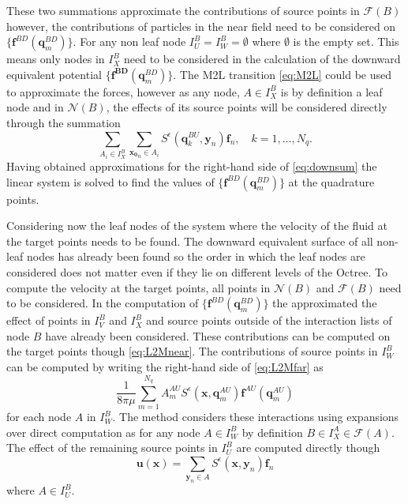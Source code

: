 These two summations approximate the contributions of source points in $\mathcal{F}(B)$ however, the contributions of particles in the near field need to be considered on $\{\bm{f}^{B D}(\bm{q}^{BD}_m)\}$. For any non leaf node $I_U^B = I_W^B = \emptyset$ where $\emptyset$ is the empty set. This means only nodes in $I_X^B$ need to be considered in the calculation of the downward equivalent potential $\{\bm{f^{BD}}(\bm{q}^{BD}_m)\}$. The M2L transition \cref{eq:M2L} could be used to approximate the forces, however as any node, $A \in I_X^B$ is by definition a leaf node and in $\mathcal{N}(B)$, the effects of its source points will be considered directly through the summation
\begin{equation}
\label{eq:X}
    \sum_{A_i \in I_X^B} \sum_{{\bm{x_0}}_n\in A_i} S^\epsilon\left(\bm{q}^{BU}_{k}, {\bm{y}}_{n}\right) {\bm{f}}_{n}, \quad k=1,\dots,N_q.
\end{equation}
Having obtained approximations for the right-hand side of \cref{eq:downsum} the linear system is solved to find the values of $\{\bm{f}^{BD}(\bm{q}^{BD}_m)\}$ at the quadrature points.

Considering now the leaf nodes of the system where the velocity of the fluid at the target points needs to be found. The downward equivalent surface of all non-leaf nodes has already been found so the order in which the leaf nodes are considered does not matter even if they lie on different levels of the Octree. To compute the velocity at the target points, all points in $\mathcal{N}(B)$ and $\mathcal{F}(B)$ need to be considered. In the computation of $\{\bm{f}^{BD}(\bm{q}^{BD}_m)\}$ the approximated the effect of points in $I_V^B$ and $I_X^B$ and source points outside of the interaction lists of node $B$ have already been considered. These contributions can be computed on the target points though \cref{eq:L2Mnear}. The contributions of source points in $I_W^B$ can be computed by writing the right-hand side of \cref{eq:L2Mfar} as
\begin{equation}
\label{eq:W}
    \frac{1}{8 \pi \mu} \sum_{m=1}^{N_{q}} A_{m}^{AU} S^\epsilon\left(\bm{x}, \bm{q}_{m}^{A U}\right) \bm{f}^{A U}\left(\bm{q}_{m}^{A U}\right)
\end{equation}
for each node $A$ in $I_W^B$. The method considers these interactions using expansions over direct computation as for any node $A \in I_W^B$ by definition $B \in I_X^A \in \mathcal{F}(A)$. The effect of the remaining source points in $I_U^B$ are computed directly though
\begin{equation}
\label{eq:U}
    \bm{u}(\bm{x}) = \sum_{{\bm{y}}_n\in A} S^\epsilon(\bm{x},{\bm{y}}_n){\bm{f}}_n
\end{equation}
where $A \in I_U^B$.

